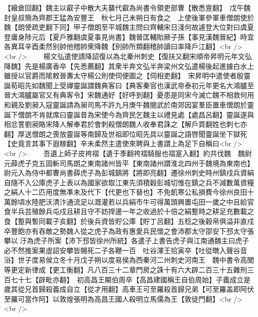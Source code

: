 【縗倉回翻】魏主以叡子中散大夫襲代叡為尚書令領吏部曹【散悉亶翻】　戊午魏封皇叔簡為齊郡王猛為安豐王　秋七月己未朔日有食之　上使後軍參軍車僧朗使於魏【朗使疏吏翻下同】甲子僧朗至平城魏主問曰齊輔宋日淺何故遽登大位對曰虞夏登庸身陟元后【夏戶雅翻虞夏事見尚書】魏晉匡輔貽厥子孫【事見漢魏晉紀】時宜各異耳辛酉柔然别帥他稽帥衆降魏【别帥所類翻稽帥讀曰率降戶江翻】<br />
<br />
　　楊文弘遣使請降詔復以為北秦州刺史【復扶又翻宋順帝昇明元年文弘降魏】先是楊廣香卒【先悉薦翻】其衆半奔文弘半奔梁州文弘遣楊後起進據白水上雖授以官爵而隂敕晉夀太守楊公則使伺便圖之【伺相吏翻】　宋昇明中遣使者殷靈誕荀昭先如魏聞上受禪靈誕謂魏典客曰【典客秦官也漢武帝泰初元年更名大鴻臚至晉大鴻臚屬官又有典客令】宋魏通好【好呼到翻】憂患是同宋今滅亡魏不相救何用和親及劉昶入寇靈誕請為昶司馬不許九月庚午魏閱武於南郊因宴羣臣置車僧朗於靈誕下僧朗不肯就席曰靈誕昔為宋使今為齊民乞魏主以禮見處【處昌呂翻】靈誕遂與相忿詈劉昶賂宋降人解奉君於會刺殺僧朗魏人收奉君誅之【解戶買翻姓也刺七亦翻】厚送僧朗之喪放靈誕等南歸及世祖即位昭先具以靈誕之語啓聞靈誕坐下獄死【史竟言其事下遐稼翻】辛未柔然主遣使來聘與上書謂上為足下自稱曰<br />
<br />
　　吾遺上師子皮袴褶【遺于季翻袴褶騎服也褶寔入翻】約共伐魏　魏尉元薛虎子克五固斬司馬朗之東南諸州皆平【東南諸州謂淮北四州于魏境為東南也】尉元入為侍中都曹尚書薛虎子為彭城鎮將【將即亮翻】遷徐州刺史時州鎮戍兵資絹自隨不入公庫虎子上表以為國家欲取江東先須積穀彭城切惟在鎮之兵不減數萬資糧之絹人十二匹用度無凖未及代下【代更也下替也】不免飢寒公私損費今徐州良田十萬餘頃水陸肥沃清汴通流足以溉灌若以兵絹市牛可得萬頭興置屯田一歲之中且給官食半兵芸殖餘兵屯戍且耕且守不妨捍邊一年之收過於十倍之絹蹔時之耕足充數載之食【蹔與暫同載子亥翻】於後兵資皆貯公庫【貯丁呂翻】五稔之後穀帛俱溢非直戍卒豐飽亦有吞敵之勢魏人從之虎子為政有惠愛兵民懷之會沛郡太守邵安下邳太守張攀以汙為虎子所案【沛下邳皆徐州所統】各遣子上書告虎子與江南通魏主曰虎子必不然推案果虛詔安攀皆賜死二子各鞭一百　吐谷渾王拾寅卒【吐從暾入聲谷音浴】世子度易侯立冬十月戊子朔以度易侯為西秦河二州刺史河南王　魏中書令高閭等更定新律成【更工衡翻】凡八百三十二章門房之誅十有六大辟二百三十五雜刑三百七十七【辟毗亦翻】　初高昌王闞伯周卒【高昌建國稱王自伯周始】子義成立是歲其從兄首歸殺義成自立【從才用翻】高車王可至羅殺首歸兄弟【可至羅盖即阿伏至羅可當作阿】以敦煌張明為高昌王國人殺明立馬儒為王【敦徒門翻】<br />
<br />
